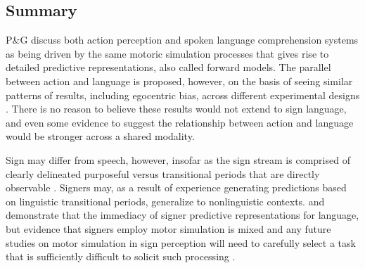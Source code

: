     \subsection{Summary}
            P\&G discuss both action perception and spoken language comprehension systems as being driven by the same motoric simulation processes that gives rise to detailed predictive representations, also called forward models. The parallel between action and language is proposed, however, on the basis of seeing similar patterns of results, including egocentric bias, across different experimental designs \cite{PG}. There is no reason to believe these results would not extend to sign language, and even some evidence to suggest the relationship between action and language would be stronger across a shared modality. \par
            Sign may differ from speech, however, insofar as the sign stream is comprised of clearly delineated purposeful versus transitional periods that are directly observable \cite{jantunen2013}. Signers may, as a result of experience generating predictions based on linguistic transitional periods, generalize to nonlinguistic contexts.  and  demonstrate that the immediacy of signer predictive representations for language, but evidence that signers employ motor simulation is mixed \cite{corina2016,watkins2017} and any future studies on motor simulation in sign perception will need to carefully select a task that is sufficiently difficult to solicit such processing \cite{hickok2011}.  \par
